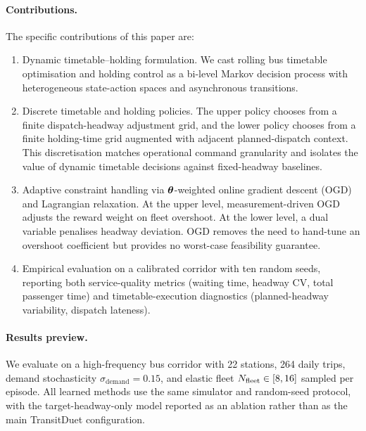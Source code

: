 \paragraph{Contributions.}
The specific contributions of this paper are:
\begin{enumerate}
    \item Dynamic timetable--holding formulation. We cast rolling bus timetable optimisation and holding control as a bi-level Markov decision process with heterogeneous state-action spaces and asynchronous transitions.
    \item Discrete timetable and holding policies. The upper policy chooses from a finite dispatch-headway adjustment grid, and the lower policy chooses from a finite holding-time grid augmented with adjacent planned-dispatch context. This discretisation matches operational command granularity and isolates the value of dynamic timetable decisions against fixed-headway baselines.
    \item Adaptive constraint handling via $\boldsymbol{\theta}$-weighted online gradient descent (OGD) and Lagrangian relaxation. At the upper level, measurement-driven OGD adjusts the reward weight on fleet overshoot. At the lower level, a dual variable penalises headway deviation. OGD removes the need to hand-tune an overshoot coefficient but provides no worst-case feasibility guarantee.
    \item Empirical evaluation on a calibrated corridor with ten random seeds, reporting both service-quality metrics (waiting time, headway CV, total passenger time) and timetable-execution diagnostics (planned-headway variability, dispatch lateness).
\end{enumerate}

\paragraph{Results preview.}
We evaluate on a high-frequency bus corridor with 22 stations, 264 daily trips, demand stochasticity $\sigma_{\mathrm{demand}} = 0.15$, and elastic fleet $N_{\mathrm{fleet}} \in [8, 16]$ sampled per episode. All learned methods use the same simulator and random-seed protocol, with the target-headway-only model reported as an ablation rather than as the main TransitDuet configuration.
